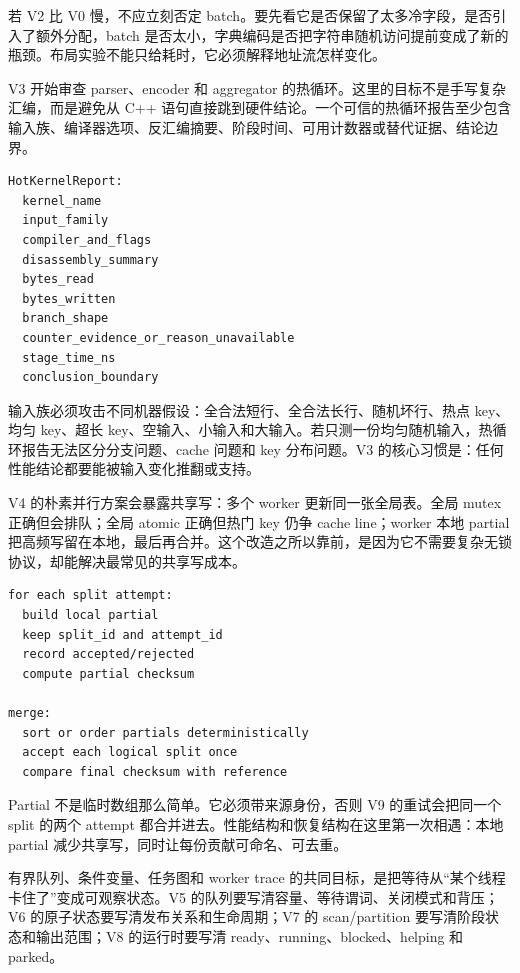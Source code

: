 若 V2 比 V0 慢，不应立刻否定 batch。要先看它是否保留了太多冷字段，是否引入了额外分配，batch 是否太小，字典编码是否把字符串随机访问提前变成了新的瓶颈。布局实验不能只给耗时，它必须解释地址流怎样变化。

V3 开始审查 parser、encoder 和 aggregator 的热循环。这里的目标不是手写复杂汇编，而是避免从 C++ 语句直接跳到硬件结论。一个可信的热循环报告至少包含输入族、编译器选项、反汇编摘要、阶段时间、可用计数器或替代证据、结论边界。

\begin{lstlisting}[numbers=none,caption={V3 HotKernelReport 的最小字段}]
HotKernelReport:
  kernel_name
  input_family
  compiler_and_flags
  disassembly_summary
  bytes_read
  bytes_written
  branch_shape
  counter_evidence_or_reason_unavailable
  stage_time_ns
  conclusion_boundary
\end{lstlisting}

输入族必须攻击不同机器假设：全合法短行、全合法长行、随机坏行、热点 key、均匀 key、超长 key、空输入、小输入和大输入。若只测一份均匀随机输入，热循环报告无法区分分支问题、cache 问题和 key 分布问题。V3 的核心习惯是：任何性能结论都要能被输入变化推翻或支持。

V4 的朴素并行方案会暴露共享写：多个 worker 更新同一张全局表。全局 mutex 正确但会排队；全局 atomic 正确但热门 key 仍争 cache line；worker 本地 partial 把高频写留在本地，最后再合并。这个改造之所以靠前，是因为它不需要复杂无锁协议，却能解决最常见的共享写成本。

\begin{lstlisting}[numbers=none,caption={V4 partial 的正确性账本}]
for each split attempt:
  build local partial
  keep split_id and attempt_id
  record accepted/rejected
  compute partial checksum

merge:
  sort or order partials deterministically
  accept each logical split once
  compare final checksum with reference
\end{lstlisting}

Partial 不是临时数组那么简单。它必须带来源身份，否则 V9 的重试会把同一个 split 的两个 attempt 都合并进去。性能结构和恢复结构在这里第一次相遇：本地 partial 减少共享写，同时让每份贡献可命名、可去重。

有界队列、条件变量、任务图和 worker trace 的共同目标，是把等待从“某个线程卡住了”变成可观察状态。V5 的队列要写清容量、等待谓词、关闭模式和背压；V6 的原子状态要写清发布关系和生命周期；V7 的 scan/partition 要写清阶段状态和输出范围；V8 的运行时要写清 ready、running、blocked、helping 和 parked。

